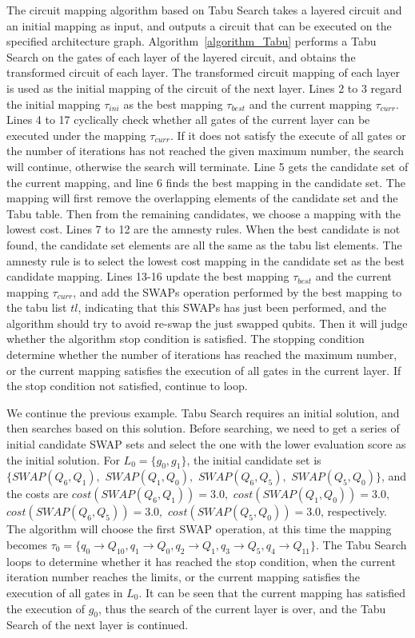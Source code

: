 \documentclass[runningheads]{llncs}
\begin{document}
The circuit mapping algorithm based on Tabu Search takes a layered circuit and an initial mapping as input, 
and outputs a circuit that can be executed on the specified architecture graph.
Algorithm~\ref{algorithm_Tabu} performs a Tabu Search on the gates of each layer of the layered circuit, 
and obtains the transformed circuit of each layer. 
The transformed circuit mapping of each layer is used as the initial mapping of the circuit of the next layer.
Lines 2 to 3 regard the initial mapping $\tau_{ini}$ 
as the best mapping $\tau_{best}$ and the current mapping $\tau_{curr}$.
Lines 4 to 17 cyclically check whether all gates of the current layer 
can be executed under the mapping $\tau_{curr}$.
If it does not satisfy the execute of all gates or the number of iterations has not reached the given maximum number, 
the search will continue, 
otherwise the search will terminate.
Line 5  gets the candidate set of the current mapping, 
and line 6 finds the best mapping in the candidate set. 
The mapping will first remove the overlapping elements 
of the candidate set and the Tabu table. 
Then from the remaining candidates, we choose a mapping with the lowest cost.
Lines 7 to 12 are the amnesty rules. When the best candidate is not found, 
the candidate set elements are all the same as the tabu list elements.
The amnesty rule is to select the lowest cost mapping in the candidate set 
as the best candidate mapping.
Lines 13-16 update the best mapping $\tau_{best}$ and 
the current mapping $\tau_{curr}$,
and add the SWAPs operation performed by the best mapping to the tabu list $tl$, 
indicating that this SWAPs has just been performed, 
and the algorithm should try to avoid re-swap the just swapped qubits. 
Then it will judge whether the algorithm stop condition is satisfied. 
The stopping condition determine whether the number of iterations 
has reached the maximum number, 
or the current mapping satisfies the execution of 
all gates in the current layer. 
If the stop condition not satisfied, continue to loop.
\begin{example}
We continue the previous example. Tabu Search requires an initial solution, 
and then searches based on this solution. 
Before searching, we need to get a series of initial candidate SWAP sets
and select the one with the lower evaluation score as the initial solution.
For $L_{0}=\{g_{0},g_{1}\}$, the initial candidate set is 
$\{SWAP(Q_{6},Q_{1}),$ $SWAP(Q_{1},Q_{0}),$ $SWAP(Q_{6},Q_{5}),$ $SWAP(Q_{5},Q_{0}) \}$, and the costs are
$cost(SWAP(Q_{6},Q_{1}))=3.0,$ $cost(SWAP(Q_{1},Q_{0}))=3.0,$\\ $cost(SWAP(Q_{6},Q_{5}))=3.0,$ $cost(SWAP(Q_{5},Q_{0}))=3.0$, respectively.
The algorithm will choose the first SWAP operation, 
at this time the mapping becomes $\tau_{0}=\{q_{0}\rightarrow  Q_{10},q_{1}\rightarrow  Q_{0},
q_{2}\rightarrow  Q_{1},q_{3}\rightarrow  Q_{5},q_{4}\rightarrow  Q_{11}\}$. 
The Tabu Search loops to determine whether it has reached the stop condition,
when the current iteration number reaches the limits, 
or the current mapping satisfies the execution of all gates in $L_{0}$.
It can be seen that the current mapping has satisfied the execution of $g_{0}$, 
thus the search of the current layer is over, and the Tabu Search of the next layer is continued.
\end{example}
\end{document}
